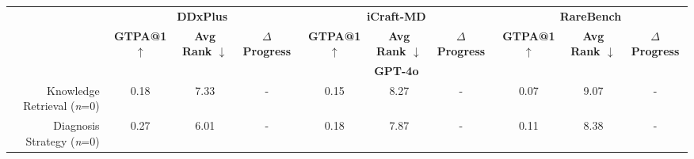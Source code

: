 \setlength{\tabcolsep}{2.4pt}
\begin{table*}[ht]
\centering
\scriptsize
\begin{tabular}{rccccccccc}
\toprule
                               & \multicolumn{3}{c}{\textbf{DDxPlus}} & \multicolumn{3}{c}{\textbf{iCraft-MD}} & \multicolumn{3}{c}{\textbf{RareBench}} \\ \cmidrule(lr){2-4} \cmidrule(lr){5-7} \cmidrule(lr){8-10}
                               & \textbf{GTPA@1 $\uparrow$}          & \textbf{Avg Rank $\downarrow$}   & \textbf{$\Delta$ Progress} & \textbf{GTPA@1 $\uparrow$}       & \textbf{Avg Rank $\downarrow$}     & \textbf{$\Delta$ Progress}   & \textbf{GTPA@1 $\uparrow$}        & \textbf{Avg Rank $\downarrow$}   & \textbf{$\Delta$ Progress}     \\\midrule
                               & \multicolumn{9}{c}{\textbf{GPT-4o}}                                                                 \\\midrule
Knowledge Retrieval (\textit{n}=0)                &      0.18      & 7.33  &  -  &   0.15      &    8.27     & -  &       0.07   &  9.07  &    -   \\
Diagnosis Strategy (\textit{n}=0)     &  0.27    &    6.01        &       -      &      0.18          &      7.87        &          -      &       0.11       &     8.38        &           -      \\

\end{tabular}
\end{table*}
